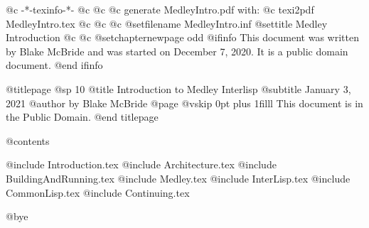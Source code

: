    @c -*-texinfo-*-
@c
@c
@c generate MedleyIntro.pdf with:
@c         texi2pdf MedleyIntro.tex
@c
@c
@c %
@setfilename MedleyIntro.inf
@settitle Medley Introduction
@c %
@c @setchapternewpage odd
@ifinfo
This document was written by Blake McBride and was started
on December 7, 2020.  It is a public domain document.
@end ifinfo

@titlepage
@sp 10
@title Introduction to Medley Interlisp
@subtitle January 3, 2021
@author by Blake McBride
@page
@vskip 0pt plus 1filll
This document is in the Public Domain.
@end titlepage

@contents

@include Introduction.tex
@include Architecture.tex
@include BuildingAndRunning.tex
@include Medley.tex
@include InterLisp.tex
@include CommonLisp.tex
@include Continuing.tex

@bye


